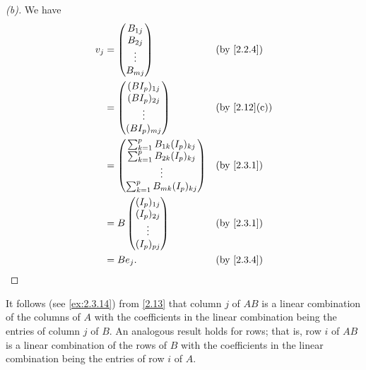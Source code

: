\begin{proof}[(b)]
  We have
  \begin{align*}
    v_j & = \begin{pmatrix}
              B_{1 j} \\
              B_{2 j} \\
              \vdots  \\
              B_{m j}
            \end{pmatrix}                     &  & \by{2.2.4}   \\
        & = \begin{pmatrix}
              (B I_p)_{1 j} \\
              (B I_p)_{2 j} \\
              \vdots        \\
              (B I_p)_{m j}
            \end{pmatrix}                     &  & \by{2.12}[c] \\
        & = \begin{pmatrix}
              \sum_{k = 1}^p B_{1 k} (I_p)_{k j} \\
              \sum_{k = 1}^p B_{2 k} (I_p)_{k j} \\
              \vdots                             \\
              \sum_{k = 1}^p B_{m k} (I_p)_{k j}
            \end{pmatrix} &  & \by{2.3.1}                  \\
        & = B \begin{pmatrix}
                (I_p)_{1 j} \\
                (I_p)_{2 j} \\
                \vdots      \\
                (I_p)_{p j}
              \end{pmatrix}                   &  & \by{2.3.1}   \\
        & = B e_j.                              &  & \by{2.3.4}
  \end{align*}
\end{proof}

\begin{note}
  It follows (see \cref{ex:2.3.14}) from \cref{2.13} that column \(j\) of \(AB\) is a linear combination of the columns of \(A\) with the coefficients in the linear combination being the entries of column \(j\) of \(B\).
  An analogous result holds for rows;
  that is, row \(i\) of \(AB\) is a linear combination of the rows of \(B\) with the coefficients in the linear combination being the entries of row \(i\) of \(A\).
\end{note}

